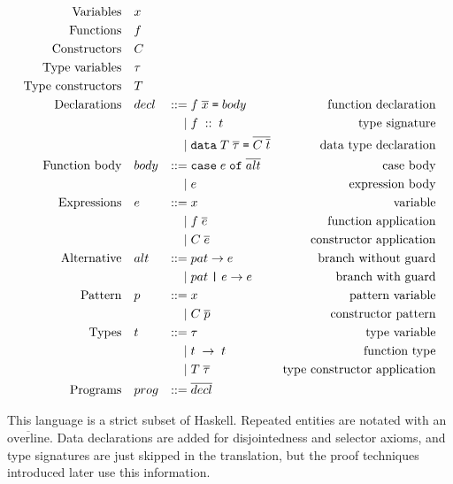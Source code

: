 \begin{equation*}
\begin{aligned}
\text{Variables} \quad & x \\
\text{Functions} \quad & f \\
\text{Constructors} \quad & C \\
\text{Type variables} \quad & \tau \\
\text{Type constructors} \quad & T \\
\defBNF{Declarations}{decl}{ f \; \overline{x} \; \hs{=} \; body}{function declaration} \\
    \defaltBNF{f \; :: \; t}{type signature} \\
    \defaltBNF{\hs{data} \; T \; \overline{\tau} \; \hs{=} \; \overline{C \; \overline{t}}}{data type declaration} \\
\defBNF{Function body}{body}{\hs{case} \; e \; \hs{of} \; \overline{alt}}{case body} \\
    \defaltBNF{e}{expression body} \\
\defBNF{Expressions}{e}{x}{variable} \\
    \defaltBNF{f \; \overline{e}}{function application} \\
    \defaltBNF{C \; \overline{e}}{constructor application} \\
\defBNF{Alternative}{alt}{pat \rightarrow e}{branch without guard} \\
    \defaltBNF{pat \; \hs{|} \; e \rightarrow e}{branch with guard} \\
\defBNF{Pattern}{p}{x}{pattern variable} \\
    \defaltBNF{C \; \overline{p}}{constructor pattern} \\
\defBNF{Types}{t}{\tau}{type variable} \\
    \defaltBNF{t \; \rightarrow \; t}{function type} \\
    \defaltBNF{T \; \overline{\tau}}{type constructor application} \\
\defBNF{Programs}{prog}{\overline{decl}}{} \\
\end{aligned}
\end{equation*}

This language is a strict subset of Haskell. Repeated entities are
notated with an $\overline{\text{overline}}$.  Data declarations are
added for disjointedness and selector axioms, and type signatures are
just skipped in the translation, but the proof techniques introduced
later use this information.

